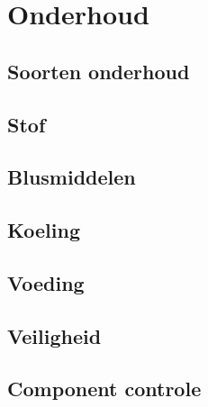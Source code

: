 \documentclass[a4paper,12pt,twoside,openright,titlepage]{book}
\begin{document}
\chapter{Onderhoud}

\section{Soorten onderhoud}

\section{Stof}

\section{Blusmiddelen}

\section{Koeling}

\section{Voeding}

\section{Veiligheid}

\section{Component controle}



\printindex
\end{document}
